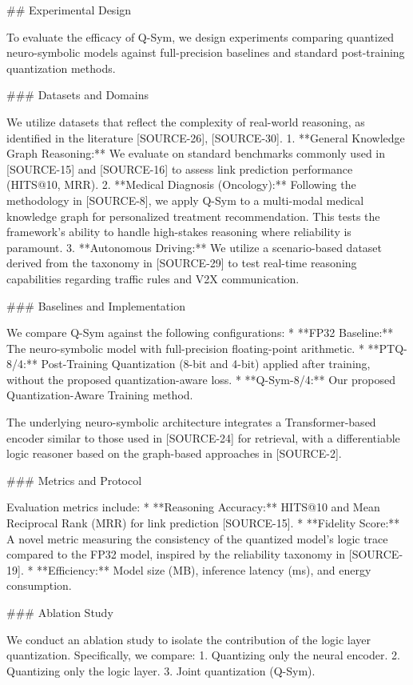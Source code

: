 \documentclass{article}
\begin{document}
\#\# Experimental Design

To evaluate the efficacy of Q-Sym, we design experiments comparing quantized neuro-symbolic models against full-precision baselines and standard post-training quantization methods.

\#\#\# Datasets and Domains

We utilize datasets that reflect the complexity of real-world reasoning, as identified in the literature [SOURCE-26], [SOURCE-30].
1.  **General Knowledge Graph Reasoning:** We evaluate on standard benchmarks commonly used in [SOURCE-15] and [SOURCE-16] to assess link prediction performance (HITS@10, MRR).
2.  **Medical Diagnosis (Oncology):** Following the methodology in [SOURCE-8], we apply Q-Sym to a multi-modal medical knowledge graph for personalized treatment recommendation. This tests the framework's ability to handle high-stakes reasoning where reliability is paramount.
3.  **Autonomous Driving:** We utilize a scenario-based dataset derived from the taxonomy in [SOURCE-29] to test real-time reasoning capabilities regarding traffic rules and V2X communication.

\#\#\# Baselines and Implementation

We compare Q-Sym against the following configurations:
*   **FP32 Baseline:** The neuro-symbolic model with full-precision floating-point arithmetic.
*   **PTQ-8/4:** Post-Training Quantization (8-bit and 4-bit) applied after training, without the proposed quantization-aware loss.
*   **Q-Sym-8/4:** Our proposed Quantization-Aware Training method.

The underlying neuro-symbolic architecture integrates a Transformer-based encoder similar to those used in [SOURCE-24] for retrieval, with a differentiable logic reasoner based on the graph-based approaches in [SOURCE-2].

\#\#\# Metrics and Protocol

Evaluation metrics include:
*   **Reasoning Accuracy:** HITS@10 and Mean Reciprocal Rank (MRR) for link prediction [SOURCE-15].
*   **Fidelity Score:** A novel metric measuring the consistency of the quantized model's logic trace compared to the FP32 model, inspired by the reliability taxonomy in [SOURCE-19].
*   **Efficiency:** Model size (MB), inference latency (ms), and energy consumption.

\#\#\# Ablation Study

We conduct an ablation study to isolate the contribution of the logic layer quantization. Specifically, we compare:
1.  Quantizing only the neural encoder.
2.  Quantizing only the logic layer.
3.  Joint quantization (Q-Sym).
\end{document}
